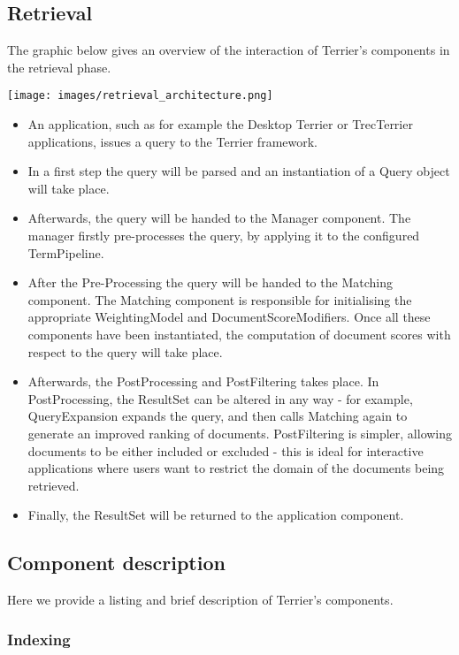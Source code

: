 \subsection{Retrieval}\label{retrieval}

The graphic below gives an overview of the interaction of Terrier's
components in the retrieval phase.

\texttt{[image: images/retrieval\_architecture.png]}

\begin{itemize}
\tightlist
\item
  An application, such as for example the Desktop Terrier or TrecTerrier
  applications, issues a query to the Terrier framework.
\item
  In a first step the query will be parsed and an instantiation of a
  Query object will take place.
\item
  Afterwards, the query will be handed to the Manager component. The
  manager firstly pre-processes the query, by applying it to the
  configured TermPipeline.
\item
  After the Pre-Processing the query will be handed to the Matching
  component. The Matching component is responsible for initialising the
  appropriate WeightingModel and DocumentScoreModifiers. Once all these
  components have been instantiated, the computation of document scores
  with respect to the query will take place.
\item
  Afterwards, the PostProcessing and PostFiltering takes place. In
  PostProcessing, the ResultSet can be altered in any way - for example,
  QueryExpansion expands the query, and then calls Matching again to
  generate an improved ranking of documents. PostFiltering is simpler,
  allowing documents to be either included or excluded - this is ideal
  for interactive applications where users want to restrict the domain
  of the documents being retrieved.
\item
  Finally, the ResultSet will be returned to the application component.
\end{itemize}

\subsection{Component description}\label{component-description}

Here we provide a listing and brief description of Terrier's components.

\subsubsection{Indexing}\label{indexing-1}


